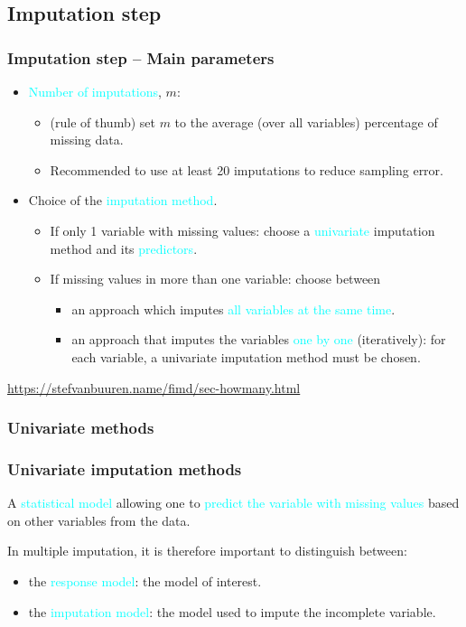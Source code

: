 \documentclass{beamer}
\begin{document}
\subsection{Imputation step}

\begin{frame}
\frametitle{Imputation step -- Main parameters}
\begin{itemize}
	\item \textcolor{cyan}{Number of imputations}, $m$:
		\begin{itemize}
			\item (rule of thumb) set $m$ to the average (over all variables) percentage of missing data.
			\item Recommended to use at least 20 imputations to reduce sampling error.
		\end{itemize}
	\item Choice of the \textcolor{cyan}{imputation method}.
		\begin{itemize}
			\item If only 1 variable with missing values: choose a \textcolor{cyan}{univariate} imputation method and its \textcolor{cyan}{predictors}. 
			\item If missing values in more than one variable: choose between
				\begin{itemize}
					\item an approach which imputes \textcolor{cyan}{all variables at the same time}.
					\item an approach that imputes the variables \textcolor{cyan}{one by one} (iteratively): for each variable, a univariate imputation method must be chosen.
				\end{itemize}
	
		\end{itemize}
\end{itemize}
\vfill
\footnotesize{\url{https://stefvanbuuren.name/fimd/sec-howmany.html}}
\end{frame}


\subsubsection{Univariate methods}


\begin{frame}
\frametitle{Univariate imputation methods}
A \textcolor{cyan}{statistical model} allowing one to \textcolor{cyan}{predict the variable with missing values} based on other variables from the data.\\ \vspace{0.3cm}

In multiple imputation, it is therefore important to distinguish between:

\begin{itemize}
	\item the \textcolor{cyan}{response model}: the model of interest.
	\item the \textcolor{cyan}{imputation model}: the model used to impute the incomplete variable.
\end{itemize}


\end{frame}
\end{document}
